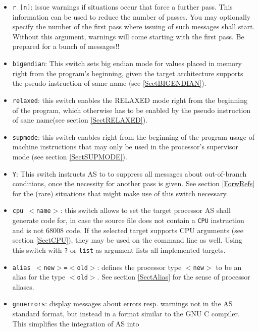 \documentclass[12pt,twoside]{report}
\newcommand{\tty}[1]{{\tt #1}}
\newcommand{\asname}{{AS}}
\begin{document}
\begin{itemize}
{      used in conjunction with the \tty{P} switch, if only the macro
      processor of \asname{} shall be used.}
\item{\tty{r [n]}: issue warnings if situations occur that force a further
      pass. This information can be used to reduce the number of
      passes.  You may optionally specify the number of the
      first pass where issuing of such messages shall start.
      Without this argument, warnings will come starting with
      the first pass.  Be prepared for a bunch of messages!!}
\item{\tty{bigendian}: This switch sets big endian mode for values placed
      in memory right from the program's beginning, given the target
      architecture supports the pseudo instruction of same name (see
      \ref{SectBIGENDIAN}).}
\item{\tty{relaxed}: this switch enables the RELAXED mode right from the
      beginning of the program, which otherwise has to be enabled by the
      pseudo instruction of sane name(see section \ref{SectRELAXED}).}
\item{\tty{supmode}: this switch enables right from the beginning of the
      program usage of machine instructions that may only be used in the
      processor's supervisor mode (see section \ref{SectSUPMODE}).}
\item{\tty{Y}: This switch instructs \asname{} to to suppress all messages about
      out-of-branch conditions, once the necessity for another pass is given.
      See section \ref{ForwRefs} for the (rare) situations that might make
      use of this switch necessary.}
\item{\tty{cpu $<$name$>$}: this switch allows to set the target processor
      \asname{} shall generate code for, in case the source file does not contain
      a {\tt CPU} instruction and is not 68008 code.  If the selected target
      supports CPU arguments (see section \ref{SectCPU}), they may be used
      on the command line as well.  Using this switch with \verb!?! or {\tt list}
      as argument lists all implemented targets.}
\item{\tty{alias $<$new$>$=$<$old$>$}:
      defines the processor type \tty{$<$new$>$} to be an alias for the
      type \tty{$<$old$>$}.  See section \ref{SectAlias} for the sense of
      processor aliases.}
\item{{\tt gnuerrors}: display messages about errors resp. warnings not
      in the \asname{} standard format, but instead in a format similar to the
      GNU C compiler.  This simplifies the integration of \asname{} into
}
\end{itemize}
\end{document}

